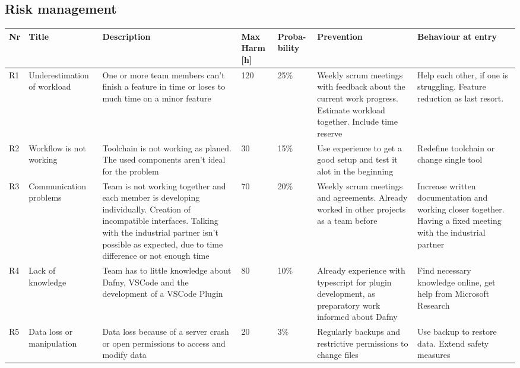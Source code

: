 \subsection{Risk management}
\begin{landscape}
	\begin{longtable}[H]
		{l|p{}| p{} | p{} | p{} | p{} | p{}}
		
		\textbf{Nr} & \textbf{Title} & \textbf{Description} & 
		\textbf{Max Harm [h]} & \textbf{Proba- bility} & \textbf{Prevention} &  
		\textbf{Behaviour at entry}\\ \hline
		
		R1 & Underestimation of workload & One or more team members can't finish a feature in time or loses to much time on a minor feature & 120 & 25\% & Weekly scrum meetings with feedback about the current work progress. Estimate workload together. Include time reserve & Help each other, if one is struggling. Feature reduction as last resort. \\ 
		
		R2 & Workflow is not working & Toolchain is not working as planed. The used components aren't ideal for the problem & 30 & 15\% & Use experience to get a good setup and test it alot in the beginning & Redefine toolchain or change single tool \\ 
		
		R3 & Communication problems & Team is not working together and each member is developing individually. Creation of incompatible interfaces. Talking with the industrial partner isn't possible as expected, due to time difference or not enough time & 70 & 20\% & Weekly scrum meetings and agreements. Already worked in other projects as a team before & Increase written documentation and working closer together. Having a fixed meeting with the industrial partner \\ 
		
		R4 & Lack of knowledge & Team has to little knowledge about Dafny, VSCode and the development of a VSCode Plugin & 80 & 10\% & Already experience with typescript for plugin development, as preparatory work informed about Dafny & Find necessary knowledge online, get help from Microsoft Research \\ 
		
		R5 & Data loss or manipulation & Data loss because of a server crash or open permissions to access and modify data & 20 & 3\% & Regularly backups and restrictive permissions to change files & Use backup to restore data. Extend safety measures \\ 
		

\end{longtable}
\end{landscape}
